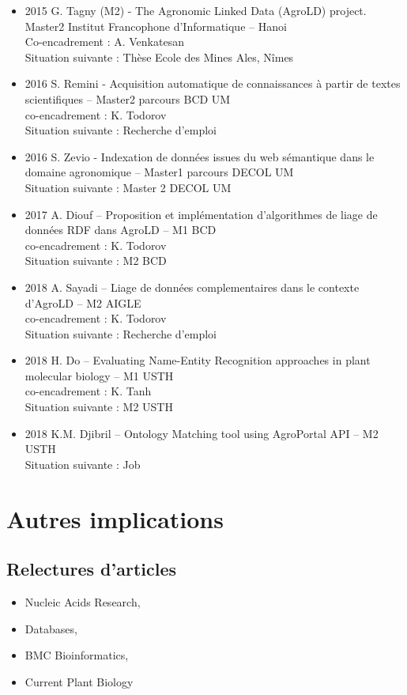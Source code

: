 \begin{itemize}
\item 2015 G. Tagny (M2) - The Agronomic Linked Data (AgroLD) project. Master2 Institut Francophone d’Informatique – Hanoi \\
Co-encadrement : A. Venkatesan \\
Situation suivante : Thèse Ecole des Mines Ales, Nîmes

\item 2016 S. Remini - Acquisition automatique de connaissances à partir de textes scientifiques – Master2 parcours BCD UM \\
co-encadrement : K. Todorov \\ 
Situation suivante : Recherche d’emploi

\item  2016 S. Zevio - Indexation de données issues du web sémantique dans le domaine agronomique – Master1 parcours DECOL UM \\
Situation suivante : Master 2 DECOL UM 

\item  2017 A. Diouf –  Proposition et implémentation d’algorithmes de liage de données RDF dans AgroLD – M1 BCD \\
co-encadrement : K. Todorov \\
Situation suivante : M2 BCD

\item  2018 A. Sayadi –  Liage de données complementaires dans le contexte d'AgroLD – M2 AIGLE \\
co-encadrement : K. Todorov \\
Situation suivante : Recherche d'emploi

\item  2018 H. Do –  Evaluating Name-Entity Recognition approaches in plant molecular biology – M1 USTH \\
co-encadrement : K. Tanh \\
Situation suivante : M2 USTH

\item  2018 K.M. Djibril –  Ontology Matching tool using AgroPortal API – M2 USTH \\
Situation suivante : Job
\end{itemize}

\section{Autres implications}
\subsection*{Relectures d’articles}
\begin{itemize}
\item Nucleic Acids Research, 
\item Databases, 
\item BMC Bioinformatics, 
\item Current Plant Biology
\end{itemize}

